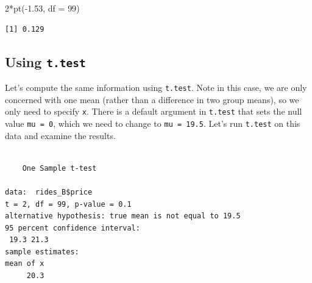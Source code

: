 \documentclass[
  letterpaper,
  DIV=11,
  numbers=noendperiod]{scrreprt}
\newenvironment{Shaded}{\begin{snugshade}}{\end{snugshade}}
\newcommand{\AttributeTok}[1]{\textcolor[rgb]{0.40,0.45,0.13}{#1}}
\newcommand{\DecValTok}[1]{\textcolor[rgb]{0.68,0.00,0.00}{#1}}
\newcommand{\FloatTok}[1]{\textcolor[rgb]{0.68,0.00,0.00}{#1}}
\newcommand{\FunctionTok}[1]{\textcolor[rgb]{0.28,0.35,0.67}{#1}}
\newcommand{\NormalTok}[1]{\textcolor[rgb]{0.00,0.23,0.31}{#1}}
\newcommand{\OtherTok}[1]{\textcolor[rgb]{0.00,0.23,0.31}{#1}}
\newcommand{\SpecialCharTok}[1]{\textcolor[rgb]{0.37,0.37,0.37}{#1}}
\theoremstyle{definition}
\theoremstyle{remark}
\begin{document}
\begin{Shaded}
\begin{Highlighting}[]
\DecValTok{2}\SpecialCharTok{*}\FunctionTok{pt}\NormalTok{(}\SpecialCharTok{{-}}\FloatTok{1.53}\NormalTok{, }\AttributeTok{df =} \DecValTok{99}\NormalTok{)}
\end{Highlighting}
\end{Shaded}

\begin{verbatim}
[1] 0.129
\end{verbatim}

\hypertarget{using-t.test}{%
\subsection{\texorpdfstring{Using
\texttt{t.test}}{Using t.test}}\label{using-t.test}}

Let's compute the same information using \texttt{t.test}. Note in this
case, we are only concerned with one mean (rather than a difference in
two group means), so we only need to specify \texttt{x}. There is a
default argument in \texttt{t.test} that sets the null value
\texttt{mu\ =\ 0}, which we need to change to \texttt{mu\ =\ 19.5}.
Let's run \texttt{t.test} on this data and examine the results.

\begin{Shaded}
\end{Shaded}

\begin{verbatim}

    One Sample t-test

data:  rides_B$price
t = 2, df = 99, p-value = 0.1
alternative hypothesis: true mean is not equal to 19.5
95 percent confidence interval:
 19.3 21.3
sample estimates:
mean of x 
     20.3 
\end{verbatim}

\begin{Shaded}
\end{Shaded}
\end{document}

